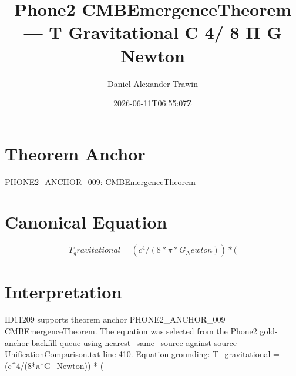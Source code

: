 \documentclass[11pt]{article}
\title{Phone2 CMBEmergenceTheorem — T Gravitational C 4/ 8 Π G Newton}
\author{Daniel Alexander Trawin}
\date{2026-06-11T06:55:07Z}
\begin{document}
\maketitle
\section*{Theorem Anchor}
PHONE2_ANCHOR_009: CMBEmergenceTheorem
\section*{Canonical Equation}
\[
T_gravitational = (c^4/(8*π*G_Newton)) * (
\]
\section*{Interpretation}
ID11209 supports theorem anchor PHONE2_ANCHOR_009 CMBEmergenceTheorem. The equation was selected from the Phone2 gold-anchor backfill queue using nearest_same_source against source UnificationComparison.txt line 410. Equation grounding: T_gravitational = (c^4/(8*π*G_Newton)) * (
\end{document}
